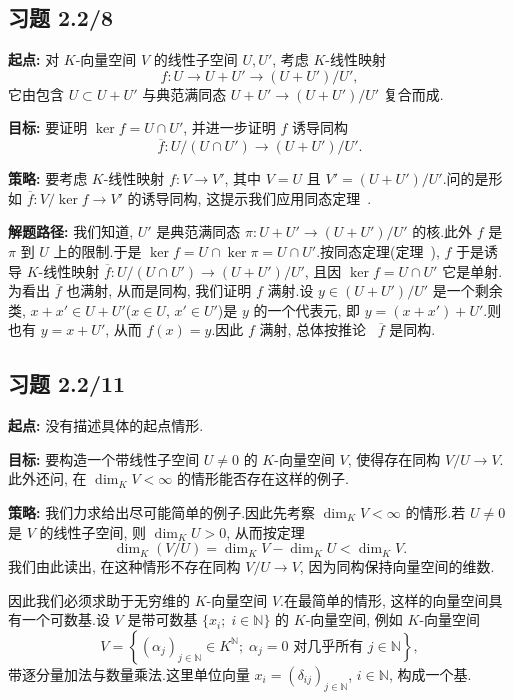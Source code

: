\subsection*{习题 2.2/8}

\noindent\textbf{起点:} 对 $K$-向量空间 $V$ 的线性子空间 $U, U'$, 考虑 $K$-线性映射
\[
f \colon U \longrightarrow U + U' \longrightarrow (U + U')/U',
\]
它由包含 $U \subset U + U'$ 与典范满同态 $U + U' \longrightarrow (U + U')/U'$ 复合而成.

\noindent\textbf{目标:} 要证明 $\ker f = U \cap U'$, 并进一步证明 $f$ 诱导同构
\[
\overline{f} \colon U/(U \cap U') \longrightarrow (U + U')/U'\text{.}
\]

\noindent\textbf{策略:} 要考虑 $K$-线性映射 $f \colon V \longrightarrow V'$, 其中 $V = U$ 且 $V' = (U + U')/U'$.问的是形如 $\overline{f} \colon V/\ker f \longrightarrow V'$ 的诱导同构, 这提示我们应用同态定理~.

\noindent\textbf{解题路径:} 我们知道, $U'$ 是典范满同态 $\pi \colon U + U' \longrightarrow (U + U')/U'$ 的核.此外 $f$ 是 $\pi$ 到 $U$ 上的限制.于是 $\ker f = U \cap \ker \pi = U \cap U'$.按同态定理(定理~), $f$ 于是诱导 $K$-线性映射 $\overline{f} \colon U/(U \cap U') \longrightarrow (U + U')/U'$, 且因 $\ker f = U \cap U'$ 它是单射.为看出 $\overline{f}$ 也满射, 从而是同构, 我们证明 $f$ 满射.设 $y \in (U + U')/U'$ 是一个剩余类, $x + x' \in U + U'$($x \in U$, $x' \in U'$)是 $y$ 的一个代表元, 即 $y = (x + x') + U'$.则也有 $y = x + U'$, 从而 $f(x) = y$.因此 $f$ 满射, 总体按推论~ $\overline{f}$ 是同构.

\subsection*{习题 2.2/11}

\noindent\textbf{起点:} 没有描述具体的起点情形.

\noindent\textbf{目标:} 要构造一个带线性子空间 $U \neq 0$ 的 $K$-向量空间 $V$, 使得存在同构 $V/U \longrightarrow V$.此外还问, 在 $\dim_K V < \infty$ 的情形能否存在这样的例子.

\noindent\textbf{策略:} 我们力求给出尽可能简单的例子.因此先考察 $\dim_K V < \infty$ 的情形.若 $U \neq 0$ 是 $V$ 的线性子空间, 则 $\dim_K U > 0$, 从而按定理~
\[
\dim_K(V/U) = \dim_K V - \dim_K U < \dim_K V.
\]
我们由此读出, 在这种情形不存在同构 $V/U \longrightarrow V$, 因为同构保持向量空间的维数.

因此我们必须求助于无穷维的 $K$-向量空间 $V$.在最简单的情形, 这样的向量空间具有一个可数基.设 $V$ 是带可数基 $\{x_i;\; i \in \mathbb{N}\}$ 的 $K$-向量空间, 例如 $K$-向量空间
\[
V = \left\{(\alpha_j)_{j \in \mathbb{N}} \in K^{\mathbb{N}};\; \alpha_j = 0 \text{ 对几乎所有 } j \in \mathbb{N} \right\},
\]
带逐分量加法与数量乘法.这里单位向量 $x_i = (\delta_{ij})_{j \in \mathbb{N}}$, $i \in \mathbb{N}$, 构成一个基.

